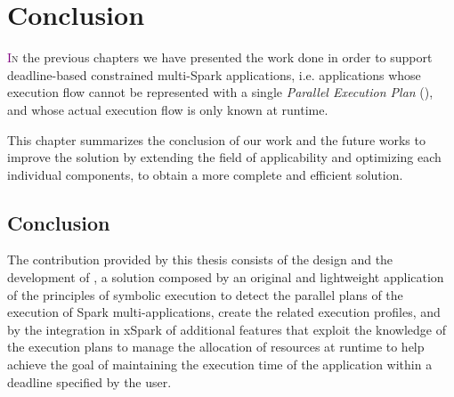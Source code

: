 \chapter{Conclusion} \label{chap:conclusion}
\lettrine[lines=4]{\textcolor{purple}{I}}{n} the previous chapters we have presented the work done in order to support deadline-based \qos constrained multi-\plan Spark applications, i.e. applications whose execution flow cannot be represented with a single \textit{Parallel Execution Plan} (\plan), and whose actual execution flow is only known at runtime. 

This chapter summarizes the conclusion of our work and the future works to improve the solution by extending the field of applicability and optimizing each  individual components, to obtain a more complete and efficient solution.

\section{Conclusion}\label{sec:conclusion}


The contribution provided by this thesis consists of the design and the development of \tool, a solution composed by an original and lightweight application of the principles of symbolic execution to detect the parallel plans of the execution of Spark multi-\plan applications, create the related execution profiles, and by the integration in xSpark of additional features that exploit the knowledge of the execution plans to manage the allocation of resources at runtime to help achieve the goal of maintaining the execution time of the application within a deadline specified by the user.

